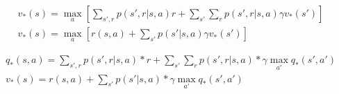 \documentclass[11pt]{article}
\begin{document}
    \begin{equation}
        \begin{split}
            v_* (s) = \max_{a} [\sum_{s',r} p(s',r| s, a) r+ \sum_{s'} \sum_{r} p(s',r| s, a) \gamma v_*(s')] \\
            v_* (s) = \max_{a} [ r(s,a) +  \sum_{s'} p(s'| s, a) \gamma v_*(s') ]
        \end{split}
    \end{equation}

    \begin{equation}
        \begin{split}
            q_* (s, a) =  \sum_{s',r} p(s',r| s, a) * r+ \sum_{s'} \sum_{r} p(s',r| s, a) * \gamma \max_{a'} q_*(s',a') \\
            v_* (s) = r(s, a) + \sum_{s'} p(s'| s, a) * \gamma \max_{a'} q_*(s',a')
        \end{split}
    \end{equation}
\end{document}
